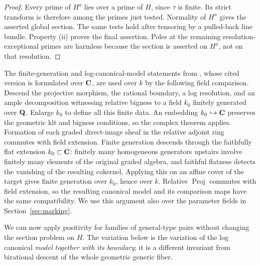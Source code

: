 \begin{proof}
Every prime of $H^a$ lies over a prime of $H$, since $\tau$ is finite.
Its strict transform is therefore among the primes just tested.
Normality of $H^a$ gives the asserted global section. The same tests
hold after tensoring by a pulled-back line bundle. Property (ii) proves
the final assertion. Poles at the remaining resolution-exceptional
primes are harmless because the section is asserted on $H^a$, not on
that resolution.
\end{proof}

The finite-generation and log-canonical-model statements from
\cite{BCHM}, whose cited version is formulated over $\mathbf C$, are used
over $k$ by the following field comparison. Descend the projective
morphism, the rational boundary, a log resolution, and an ample
decomposition witnessing relative bigness to a field $k_0$ finitely
generated over $\mathbf Q$. Enlarge $k_0$ to define all this finite data.
An embedding $k_0\hookrightarrow\mathbf C$ preserves the geometric klt
and bigness conditions, so the complex theorem applies. Formation
of each graded direct-image sheaf in the relative adjoint ring
commutes with field extension. Finite generation descends through
the faithfully flat extension $k_0\subset\mathbf C$: finitely many
homogeneous generators upstairs involve finitely many elements of
the original graded algebra, and faithful flatness detects the
vanishing of the resulting cokernel. Applying this on an affine
cover of the target gives finite generation over $k_0$, hence over
$k$. Relative $\operatorname{Proj}$ commutes with field extension,
so the resulting canonical model and its comparison maps have the
same compatibility. We use this argument also over the parameter
fields in Section~\ref{sec:marking}.

We can now apply positivity for families of general-type pairs
without changing the section problem on $H$. The variation below is
the variation of the log canonical \emph{model together with its
boundary}; it is a different invariant from birational descent of the
whole geometric generic fiber.

